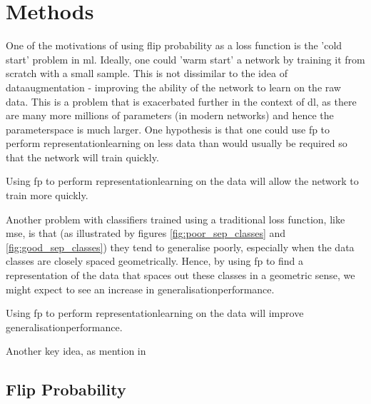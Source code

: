 \chapter{Methods}

One of the motivations of using flip probability as a loss function is the 'cold start' problem in \gls{ml}. Ideally, one could 'warm start' a network by training it from scratch with a small sample. This is not dissimilar to the idea of \gls{dataaugmentation} - improving the ability of the network to learn on the raw data. This is a problem that is exacerbated further in the context of \gls{dl}, as there are many more millions of parameters (in modern networks) and hence the \gls{parameterspace} is much larger. One hypothesis is that one could use \gls{fp} to perform \gls{representationlearning} on less data than would usually be required so that the network will train quickly.

\begin{hypothesis} %
Using \gls{fp} to perform \gls{representationlearning} on the data will allow the network to train more quickly.
\label{hyp:first}
\end{hypothesis}

Another problem with classifiers trained using a traditional loss function, like \gls{mse}, is that (as illustrated by figures \ref{fig:poor_sep_classes} and \ref{fig:good_sep_classes}) they tend to generalise poorly, especially when the data classes are closely spaced geometrically. Hence, by using \gls{fp} to find a representation of the data that spaces out these classes in a geometric sense, we might expect to see an increase in \gls{generalisationperformance}.

\begin{hypothesis} %
Using \gls{fp} to perform \gls{representationlearning} on the data will improve \gls{generalisationperformance}.
\label{hyp:second}
\end{hypothesis}

Another key idea, as mention in 

\section{Flip Probability}

